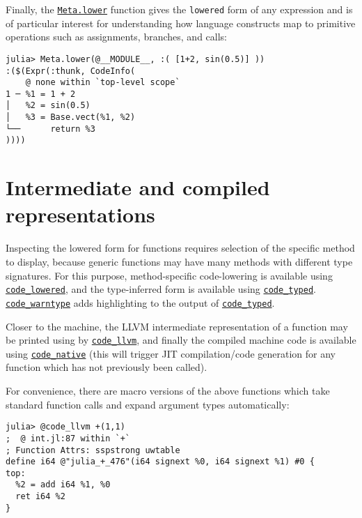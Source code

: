 Finally, the \hyperlink{6644553029841096787}{\texttt{Meta.lower}} function gives the \texttt{lowered} form of any expression and is of particular interest for understanding how language constructs map to primitive operations such as assignments, branches, and calls:




\begin{verbatim}
julia> Meta.lower(@__MODULE__, :( [1+2, sin(0.5)] ))
:($(Expr(:thunk, CodeInfo(
    @ none within `top-level scope`
1 ─ %1 = 1 + 2
│   %2 = sin(0.5)
│   %3 = Base.vect(%1, %2)
└──      return %3
))))
\end{verbatim}



\hypertarget{5101839880113461479}{}


\section{Intermediate and compiled representations}



Inspecting the lowered form for functions requires selection of the specific method to display, because generic functions may have many methods with different type signatures. For this purpose, method-specific code-lowering is available using \hyperlink{18235967286596219009}{\texttt{code\_lowered}}, and the type-inferred form is available using \hyperlink{14801595959157535515}{\texttt{code\_typed}}. \hyperlink{5565852192659724503}{\texttt{code\_warntype}} adds highlighting to the output of \hyperlink{14801595959157535515}{\texttt{code\_typed}}.



Closer to the machine, the LLVM intermediate representation of a function may be printed using by \hyperlink{1749471484368489435}{\texttt{code\_llvm}}, and finally the compiled machine code is available using \hyperlink{2534314152947301270}{\texttt{code\_native}} (this will trigger JIT compilation/code generation for any function which has not previously been called).



For convenience, there are macro versions of the above functions which take standard function calls and expand argument types automatically:




\begin{verbatim}
julia> @code_llvm +(1,1)
;  @ int.jl:87 within `+`
; Function Attrs: sspstrong uwtable
define i64 @"julia_+_476"(i64 signext %0, i64 signext %1) #0 {
top:
  %2 = add i64 %1, %0
  ret i64 %2
}
\end{verbatim}



